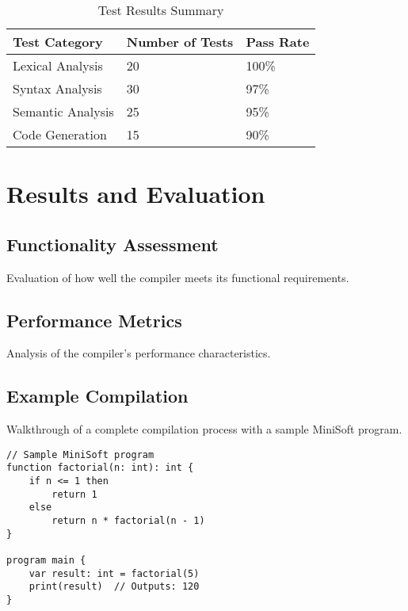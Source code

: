 \documentclass[12pt,a4paper]{article}
\begin{document}
\begin{table}[H]
	\centering
	\begin{tabularx}{\textwidth}{|X|X|X|}
		\hline
		\textbf{Test Category} & \textbf{Number of Tests} & \textbf{Pass Rate} \\
		\hline
		Lexical Analysis       & 20                       & 100\%              \\
		\hline
		Syntax Analysis        & 30                       & 97\%               \\
		\hline
		Semantic Analysis      & 25                       & 95\%               \\
		\hline
		Code Generation        & 15                       & 90\%               \\
		\hline
	\end{tabularx}
	\caption{Test Results Summary}
	\label{tab:test-results}
\end{table}

\section{Results and Evaluation}
\subsection{Functionality Assessment}
Evaluation of how well the compiler meets its functional requirements.

\subsection{Performance Metrics}
Analysis of the compiler's performance characteristics.

\subsection{Example Compilation}
Walkthrough of a complete compilation process with a sample MiniSoft program.

\begin{lstlisting}[caption={Sample MiniSoft Program}]
// Sample MiniSoft program
function factorial(n: int): int {
    if n <= 1 then
        return 1
    else
        return n * factorial(n - 1)
}

program main {
    var result: int = factorial(5)
    print(result)  // Outputs: 120
}
\end{lstlisting}
\end{document}
